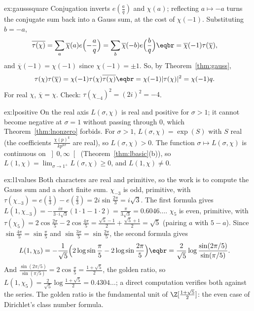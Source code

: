 \begin{solution}{ex:gausssquare}
\idea Conjugation inverts $e(\frac aq)$ and $\chi(a)$; reflecting $a\mapsto-a$ turns the conjugate sum back into a Gauss sum, at the cost of $\chi(-1)$.
\writeup Substituting $b=-a$,
\[
\begin{aligned}\overline{\tau(\chi)}&=\sum_a\overline\chi(a)e\Bigl(-\frac aq\Bigr)=\sum_b\overline\chi(-b)e\Bigl(\frac bq\Bigr)\eqbr=\overline\chi(-1)\tau(\overline\chi),\end{aligned}
\]
and $\overline\chi(-1)=\chi(-1)$ since $\chi(-1)=\pm1$. So, by Theorem~\ref{thm:gauss},
\[
\begin{aligned}\tau(\chi)\tau(\overline\chi)&=\chi(-1)\tau(\chi)\overline{\tau(\chi)}\eqbr=\chi(-1)|\tau(\chi)|^2=\chi(-1)q.\end{aligned}
\]
For real $\chi$, $\overline\chi=\chi$. Check: $\tau(\chi_{-4})^2=(2i)^2=-4$.
\end{solution}

\begin{solution}{ex:lpositive}
\idea On the real axis $L(\sigma,\chi)$ is real and positive for $\sigma>1$; it cannot become negative at $\sigma=1$ without passing through $0$, which
Theorem~\ref{thm:lnonzero} forbids.
\writeup For $\sigma>1$, $L(\sigma,\chi)=\exp(S)$ with $S$ real (the coefficients $\frac{\chi(p)^k}{kp^{k\sigma}}$ are real), so $L(\sigma,\chi)>0$. The function $\sigma\mapsto L(\sigma,\chi)$ is
continuous on $\left]0,\infty\right[$ (Theorem~\ref{thm:lbasic}(b)), so $L(1,\chi)=\lim_{\sigma\to1^+}L(\sigma,\chi)\ge0$, and $L(1,\chi)\ne0$.
\end{solution}

\begin{solution}{ex:l1values}
\idea Both characters are real and primitive, so the work is to compute the Gauss sum and a short finite sum.
\writeup $\chi_{-3}$ is odd, primitive, with $\tau(\chi_{-3})=e(\frac13)-e(\frac23)=2i\sin\frac{2\pi}3=i\sqrt3$. The first formula gives
$L(1,\chi_{-3})=-\frac{i\pi}{3\cdot i\sqrt3}(1\cdot1-1\cdot2)=\frac\pi{3\sqrt3}=0.6046\ldots$. $\chi_5$ is even, primitive, with $\tau(\chi_5)=2\cos\frac{2\pi}5-2\cos\frac{4\pi}5=\frac{\sqrt5-1}2+\frac{\sqrt5+1}2=\sqrt5$
(pairing $a$ with $5-a$). Since $\sin\frac{4\pi}5=\sin\frac\pi5$ and $\sin\frac{3\pi}5=\sin\frac{2\pi}5$, the second formula gives
\[
\begin{aligned}L(1,\chi_5)&=-\frac1{\sqrt5}\Bigl(2\log\sin\frac\pi5-2\log\sin\frac{2\pi}5\Bigr)\eqbr=\frac2{\sqrt5}\log\frac{\sin(2\pi/5)}{\sin(\pi/5)}.\end{aligned}
\]
And $\frac{\sin(2\pi/5)}{\sin(\pi/5)}=2\cos\frac\pi5=\frac{1+\sqrt5}2$, the golden ratio, so $L(1,\chi_5)=\frac2{\sqrt5}\log\frac{1+\sqrt5}2=0.4304\ldots$; a direct computation verifies both against the
series. The golden ratio is the fundamental unit of $\Z[\frac{1+\sqrt5}2]$: the even case of Dirichlet's class number formula.
\end{solution}

